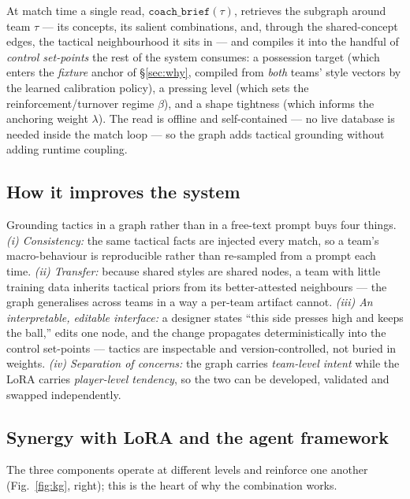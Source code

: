 \documentclass[11pt]{article}
\theoremstyle{definition}
\theoremstyle{remark}
\begin{document}
At match time a single read, $\texttt{coach\_brief}(\tau)$, retrieves the subgraph around team $\tau$ --- its concepts, its salient combinations, and, through the shared-concept edges, the tactical neighbourhood it sits in --- and compiles it into the handful of \emph{control set-points} the rest of the system consumes: a possession target (which enters the \emph{fixture} anchor of \S\ref{sec:why}, compiled from \emph{both} teams' style vectors by the learned calibration policy), a pressing level (which sets the reinforcement/turnover regime $\beta$), and a shape tightness (which informs the anchoring weight $\lambda$). The read is offline and self-contained --- no live database is needed inside the match loop --- so the graph adds tactical grounding without adding runtime coupling.

\subsection{How it improves the system}

Grounding tactics in a graph rather than in a free-text prompt buys four things. \emph{(i) Consistency:} the same tactical facts are injected every match, so a team's macro-behaviour is reproducible rather than re-sampled from a prompt each time. \emph{(ii) Transfer:} because shared styles are shared nodes, a team with little training data inherits tactical priors from its better-attested neighbours --- the graph generalises across teams in a way a per-team artifact cannot. \emph{(iii) An interpretable, editable interface:} a designer states ``this side presses high and keeps the ball,'' edits one node, and the change propagates deterministically into the control set-points --- tactics are inspectable and version-controlled, not buried in weights. \emph{(iv) Separation of concerns:} the graph carries \emph{team-level intent} while the LoRA carries \emph{player-level tendency}, so the two can be developed, validated and swapped independently.

\subsection{Synergy with LoRA and the agent framework}

The three components operate at different levels and reinforce one another (Fig.~\ref{fig:kg}, right); this is the heart of why the combination works.
\end{document}
